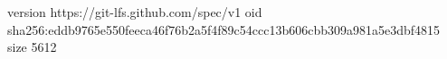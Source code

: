 version https://git-lfs.github.com/spec/v1
oid sha256:eddb9765e550feeca46f76b2a5f4f89c54ccc13b606cbb309a981a5e3dbf4815
size 5612
